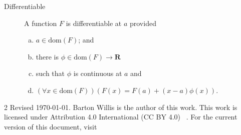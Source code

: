 \documentclass[letterpaper,landscape,9pt,fleqn]{extarticle}
\newcommand{\dom}{\mathrm{dom}}
\newcommand{\reals}{\mathbf{R}}
\newenvironment{alphalist}{
  \begin{enumerate}[(a)]
    \addtolength{\itemsep}{-1.0\itemsep}}
  {\end{enumerate}}
\begin{document}
\begin{multicols*}{3}
\begin{description}
    \item[Differentiable] A function $F$ is differentiable at $a$ provided
     \begin{alphalist}
    \item $a \in \dom(F)$; and
       \item there is $\phi \in \dom(F) \to \reals$
       \item such that $\phi$ is continuous at $a$ and
       \item $(\forall x \in \dom(F))(F(x) = F(a) + (x-a) \phi(x))$.
     \end{alphalist}

\end{description}
\end{multicols*}{2}
\vfill
\noindent Revised \today. Barton Willis is the author of this work. This work is
licensed under Attribution 4.0 International (CC BY 4.0) \,  . For the current version of
this document, visit \,  
\end{document}
